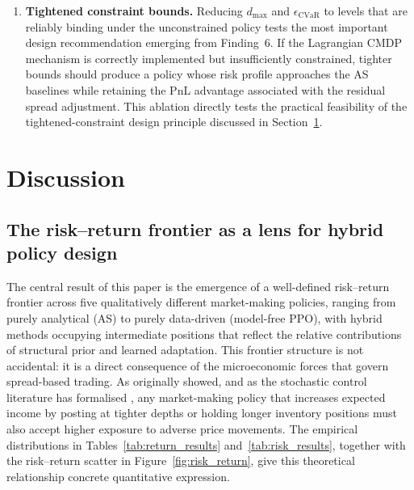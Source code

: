 \documentclass[11pt]{article}
\begin{document}
\begin{enumerate}[leftmargin=*, label=(\arabic*), itemsep=6pt]
  \item \textbf{Tightened constraint bounds.}
    Reducing $d_{\max}$ and $\epsilon_{\text{CVaR}}$ to levels that
    are reliably binding under the unconstrained policy tests the most
    important design recommendation emerging from Finding~6.
    If the Lagrangian CMDP mechanism is correctly implemented but
    insufficiently constrained, tighter bounds should produce a policy
    whose risk profile approaches the AS baselines while retaining
    the PnL advantage associated with the residual spread adjustment.
    This ablation directly tests the practical feasibility of the
    tightened-constraint design principle discussed in
    Section~\ref{sec:discussion}.
\end{enumerate}

\section{Discussion}
\label{sec:discussion}

\subsection{The risk--return frontier as a lens for hybrid policy design}

The central result of this paper is the emergence of a well-defined
risk--return frontier across five qualitatively different market-making
policies, ranging from purely analytical (AS) to purely data-driven
(model-free PPO), with hybrid methods occupying intermediate positions
that reflect the relative contributions of structural prior and
learned adaptation.
This frontier structure is not accidental: it is a direct consequence
of the microeconomic forces that govern spread-based trading.
As \textcite{ho1981dealer} originally showed, and as the stochastic
control literature has formalised \parencite{cartea2015ahft,gueant2013inventory},
any market-making policy that increases expected income by posting at
tighter depths or holding longer inventory positions must also accept
higher exposure to adverse price movements.
The empirical distributions in Tables~\ref{tab:return_results}
and~\ref{tab:risk_results}, together with the risk--return scatter in
Figure~\ref{fig:risk_return}, give this theoretical relationship concrete
quantitative expression.
\end{document}

